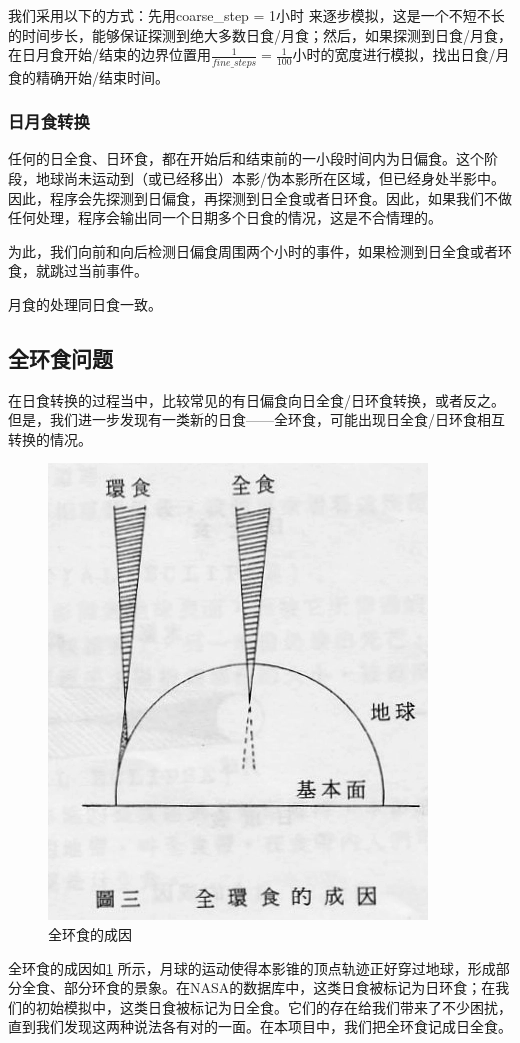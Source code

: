 \documentclass[hidelinks]{article}
\newcommand{\dps}{\displaystyle}
\begin{document}
我们采用以下的方式：先用coarse\_step = 1小时 来逐步模拟，这是一个不短不长的时间步长，能够保证探测到绝大多数日食/月食；然后，如果探测到日食/月食，在日月食开始/结束的边界位置用$\dps\frac{1}{fine\_steps} = \frac 1 {100}$小时的宽度进行模拟，找出日食/月食的精确开始/结束时间。

\subsubsection{日月食转换}
任何的日全食、日环食，都在开始后和结束前的一小段时间内为日偏食。这个阶段，地球尚未运动到（或已经移出）本影/伪本影所在区域，但已经身处半影中。因此，程序会先探测到日偏食，再探测到日全食或者日环食。因此，如果我们不做任何处理，程序会输出同一个日期多个日食的情况，这是不合情理的。

为此，我们向前和向后检测日偏食周围两个小时的事件，如果检测到日全食或者环食，就跳过当前事件。

月食的处理同日食一致。

\subsection{全环食问题}

在日食转换的过程当中，比较常见的有日偏食向日全食/日环食转换，或者反之。但是，我们进一步发现有一类新的日食——全环食，可能出现日全食/日环食相互转换的情况。
\begin{figure}[h]
    \centering
    \includegraphics[width=0.4\linewidth]{images/hybrid_eclipse.png}
    \caption{全环食的成因}
    \label{fig:hybrid_eclipse}
\end{figure}

全环食的成因如\ref{fig:hybrid_eclipse}
所示，月球的运动使得本影锥的顶点轨迹正好穿过地球，形成部分全食、部分环食的景象。在NASA的数据库中，这类日食被标记为日环食；在我们的初始模拟中，这类日食被标记为日全食。它们的存在给我们带来了不少困扰，直到我们发现这两种说法各有对的一面。在本项目中，我们把全环食记成日全食。
\end{document}
